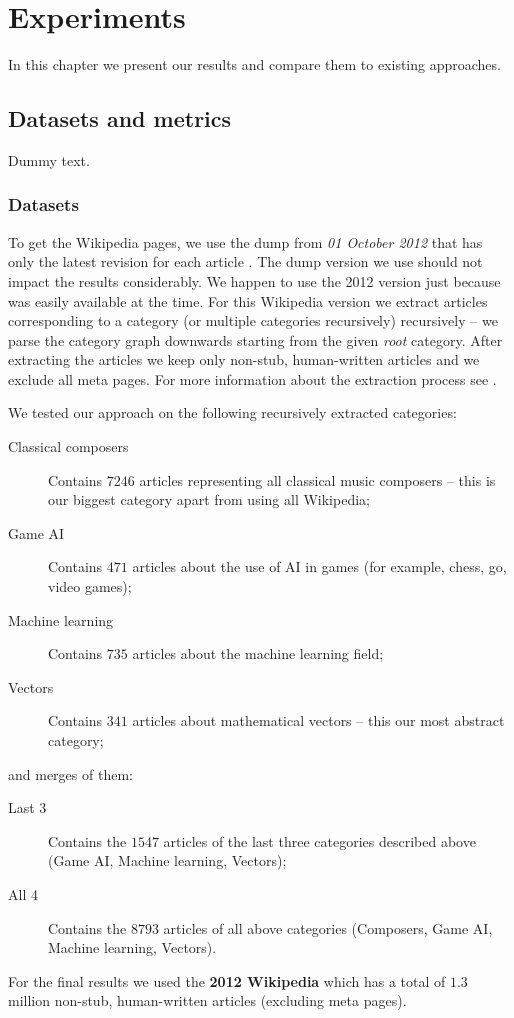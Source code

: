 \chapter{Experiments}

In this chapter we present our results and compare them to existing approaches.

\section{Datasets and metrics}

Dummy text.

\subsection{Datasets}

To get the Wikipedia pages, we use the dump from \emph{01 October 2012} that
has only the latest revision for each article . The dump version we use should not impact the results considerably. We
happen to use the 2012 version just because was easily available at the time.
For this Wikipedia version we extract articles corresponding to a category (or
multiple categories recursively) recursively -- we parse the category graph
downwards starting from the given \emph{root} category. After extracting the
articles we keep only non-stub, human-written articles and we exclude all meta
pages. For more information about the extraction process see
.

We tested our approach on the following recursively extracted categories:
\begin{description}
  \item[Classical composers] Contains \(7246\) articles representing all
  classical music composers -- this is our biggest category apart from using all
  Wikipedia;
  \item[Game \acl{AI}] Contains \(471\) articles about the use
  of \ac{AI} in games (for example, chess, go, video games);
  \item[Machine learning] Contains \(735\) articles about the machine learning
  field;
  \item[Vectors] Contains \(341\) articles about mathematical vectors -- this
  our most abstract category;
\end{description}
and merges of them:
\begin{description}
  \item[Last 3] Contains the \(1547\) articles of the last three categories
  described above (Game \ac{AI}, Machine learning, Vectors);
  \item[All 4] Contains the \(8793\) articles of all above categories
  (Composers, Game \ac{AI}, Machine learning, Vectors).
\end{description}
For the final results we used the \textbf{2012 Wikipedia} which has a total of
\(1.3\) million  non-stub, human-written
articles (excluding meta pages).

